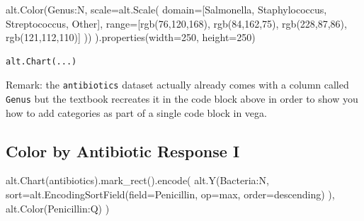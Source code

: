 \documentclass[
  letterpaper,
  DIV=11,
  numbers=noendperiod]{scrartcl}
\newenvironment{Shaded}{\begin{snugshade}}{\end{snugshade}}
\newcommand{\BuiltInTok}[1]{\textcolor[rgb]{0.00,0.23,0.31}{#1}}
\newcommand{\DecValTok}[1]{\textcolor[rgb]{0.68,0.00,0.00}{#1}}
\newcommand{\NormalTok}[1]{\textcolor[rgb]{0.00,0.23,0.31}{#1}}
\newcommand{\OperatorTok}[1]{\textcolor[rgb]{0.37,0.37,0.37}{#1}}
\newcommand{\StringTok}[1]{\textcolor[rgb]{0.13,0.47,0.30}{#1}}
\begin{document}
\begin{Shaded}
\begin{Highlighting}[]
\NormalTok{    alt.Color(}\StringTok{\textquotesingle{}Genus:N\textquotesingle{}}\NormalTok{,}
\NormalTok{          scale}\OperatorTok{=}\NormalTok{alt.Scale(}
\NormalTok{            domain}\OperatorTok{=}\NormalTok{[}\StringTok{\textquotesingle{}Salmonella\textquotesingle{}}\NormalTok{, }\StringTok{\textquotesingle{}Staphylococcus\textquotesingle{}}\NormalTok{, }\StringTok{\textquotesingle{}Streptococcus\textquotesingle{}}\NormalTok{, }\StringTok{\textquotesingle{}Other\textquotesingle{}}\NormalTok{],}
            \BuiltInTok{range}\OperatorTok{=}\NormalTok{[}\StringTok{\textquotesingle{}rgb(76,120,168)\textquotesingle{}}\NormalTok{, }\StringTok{\textquotesingle{}rgb(84,162,75)\textquotesingle{}}\NormalTok{, }\StringTok{\textquotesingle{}rgb(228,87,86)\textquotesingle{}}\NormalTok{, }\StringTok{\textquotesingle{}rgb(121,112,110)\textquotesingle{}}\NormalTok{]}
\NormalTok{          ))}
\NormalTok{).properties(width}\OperatorTok{=}\DecValTok{250}\NormalTok{, height}\OperatorTok{=}\DecValTok{250}\NormalTok{)}
\end{Highlighting}
\end{Shaded}

\begin{verbatim}
alt.Chart(...)
\end{verbatim}

Remark: the \texttt{antibiotics} dataset actually already comes with a
column called \texttt{Genus} but the textbook recreates it in the code
block above in order to show you how to add categories as part of a
single code block in vega.

\subsection{Color by Antibiotic Response
I}\label{color-by-antibiotic-response-i}

\begin{Shaded}
\begin{Highlighting}[]
\NormalTok{alt.Chart(antibiotics).mark\_rect().encode(}
\NormalTok{    alt.Y(}\StringTok{\textquotesingle{}Bacteria:N\textquotesingle{}}\NormalTok{,}
\NormalTok{      sort}\OperatorTok{=}\NormalTok{alt.EncodingSortField(field}\OperatorTok{=}\StringTok{\textquotesingle{}Penicillin\textquotesingle{}}\NormalTok{, op}\OperatorTok{=}\StringTok{\textquotesingle{}max\textquotesingle{}}\NormalTok{, order}\OperatorTok{=}\StringTok{\textquotesingle{}descending\textquotesingle{}}\NormalTok{)}
\NormalTok{    ),}
\NormalTok{    alt.Color(}\StringTok{\textquotesingle{}Penicillin:Q\textquotesingle{}}\NormalTok{)}
\NormalTok{)}
\end{Highlighting}
\end{Shaded}
\end{document}
